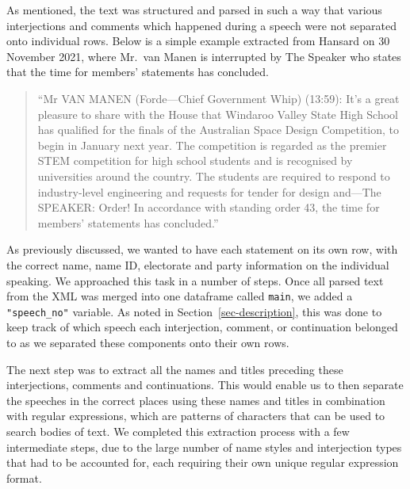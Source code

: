 \documentclass[
  letterpaper,
  DIV=11,
  numbers=noendperiod]{scrartcl}
\begin{document}
As mentioned, the text was structured and parsed in such a way that
various interjections and comments which happened during a speech were
not separated onto individual rows. Below is a simple example extracted
from Hansard on 30 November 2021, where Mr.~van Manen is interrupted by
The Speaker who states that the time for members' statements has
concluded.

\begin{quote}
``Mr VAN MANEN (Forde---Chief Government Whip) (13:59): It's a great
pleasure to share with the House that Windaroo Valley State High School
has qualified for the finals of the Australian Space Design Competition,
to begin in January next year. The competition is regarded as the
premier STEM competition for high school students and is recognised by
universities around the country. The students are required to respond to
industry-level engineering and requests for tender for design and---The
SPEAKER: Order! In accordance with standing order 43, the time for
members' statements has concluded.''
\end{quote}

As previously discussed, we wanted to have each statement on its own
row, with the correct name, name ID, electorate and party information on
the individual speaking. We approached this task in a number of steps.
Once all parsed text from the XML was merged into one dataframe called
\texttt{main}, we added a \texttt{"speech\_no"} variable. As noted in
Section~\ref{sec-description}, this was done to keep track of which
speech each interjection, comment, or continuation belonged to as we
separated these components onto their own rows.

The next step was to extract all the names and titles preceding these
interjections, comments and continuations. This would enable us to then
separate the speeches in the correct places using these names and titles
in combination with regular expressions, which are patterns of
characters that can be used to search bodies of text. We completed this
extraction process with a few intermediate steps, due to the large
number of name styles and interjection types that had to be accounted
for, each requiring their own unique regular expression format.
\end{document}

